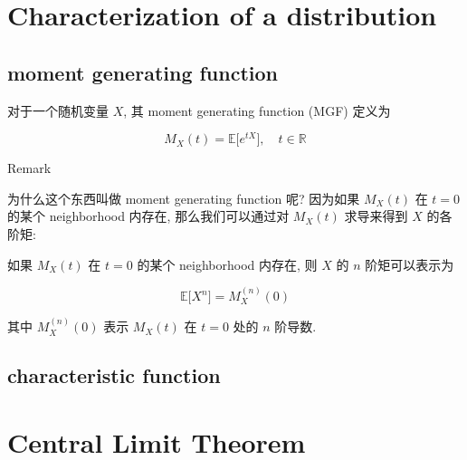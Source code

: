 \section{Characterization of a distribution}\label{characterization-of-a-distribution}

\subsection{moment generating function}\label{moment-generating-function}

\begin{definition}{}

对于一个随机变量 \(\mathit{X}\), 其 moment generating function (MGF) 定义为

\[\mathit{M}_{\mathit{X}}(\mathit{t}) = \mathbb{E}\lbrack\mathit{e}^{\mathit{t}\mathit{X}}\rbrack,\quad\mathit{t} \in \mathbb{R}\]

\end{definition}

\begin{qlremark}{Remark}

为什么这个东西叫做 moment generating function 呢? 因为如果 \(\mathit{M}_{\mathit{X}}(\mathit{t})\) 在 \(\mathit{t} = 0\) 的某个 neighborhood 内存在, 那么我们可以通过对 \(\mathit{M}_{\mathit{X}}(\mathit{t})\) 求导来得到 \(\mathit{X}\) 的各阶矩:

\end{qlremark}

\begin{proposition}

如果 \(\mathit{M}_{\mathit{X}}(\mathit{t})\) 在 \(\mathit{t} = 0\) 的某个 neighborhood 内存在, 则 \(\mathit{X}\) 的 \(\mathit{n}\) 阶矩可以表示为

\[\mathbb{E}\lbrack\mathit{X}^{\mathit{n}}\rbrack = \mathit{M}_{\mathit{X}}^{(\mathit{n})}(0)\]

其中 \(\mathit{M}_{\mathit{X}}^{(\mathit{n})}(0)\) 表示 \(\mathit{M}_{\mathit{X}}(\mathit{t})\) 在 \(\mathit{t} = 0\) 处的 \(\mathit{n}\) 阶导数.

\end{proposition}

\subsection{characteristic function}\label{characteristic-function}

\section{Central Limit Theorem}\label{central-limit-theorem-1}

